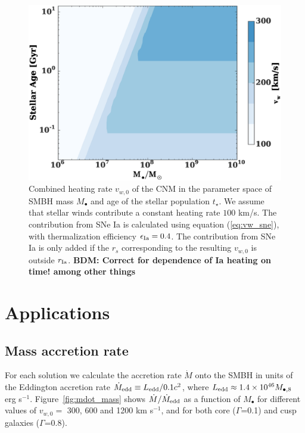 \documentclass[usenatbib,fleqn]{mn2e}
\newcommand{\Mbh}[1][]{M_{\bullet#1}}
\newcommand{\rIa}{r_{\rm Ia}}
\newcommand{\vwO}{v_{w,0}}
\begin{document}
  \begin{figure}
    \includegraphics[width=\columnwidth]{vw-contour.eps}
    \caption{\label{fig:vweff} Combined heating rate $\vwO$ of the CNM
      in the parameter space of SMBH mass $\Mbh$ and age of the
      stellar population $t_{\star}$.  We assume that stellar winds
      contribute a constant heating rate $100$ km/s. The contribution
      from SNe Ia is calculated using equation (\ref{eq:vw_sne}), with
      thermalization efficiency $\epsilon_{\rm Ia}=0.4$. The
      contribution from SNe Ia is only added if the $r_s$
      corresponding to the resulting $\vwO$ is outside
      $\rIa$.  {\bf BDM: Correct for dependence of Ia heating on time!
      among  other things}}%
  \end{figure}



\section{Applications}
\label{sec:applications}

\subsection{Mass accretion rate}

For each solution we calculate the accretion rate $\dot{M}$ onto the
SMBH in units of the Eddington accretion rate $\dot{M}_{\rm edd}
\equiv L_{\rm edd}/0.1 c^{2}$, where $L_{\rm edd} \approx 1.4\times
10^{46}M_{\bullet,8}$ erg s$^{-1}$.  Figure~\ref{fig:mdot_mass} shows
$\dot{M}/\dot{M}_{\rm edd}$ as a function of $\Mbh$ for different
values of $\vwO =$ 300, 600 and 1200 km s$^{-1}$, and for
both core ($\Gamma$=0.1) and cusp galaxies ($\Gamma$=0.8).
\end{document}
